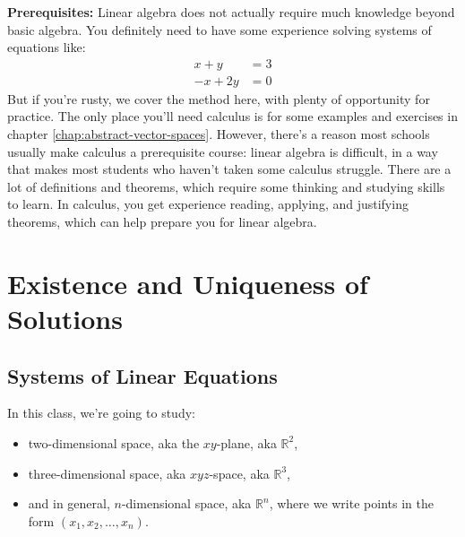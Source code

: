 \documentclass[11pt, letterpaper]{report}
\newcounter{exercise}[section]
\newcounter{example}[section]
\newcounter{theorem}[chapter]
\newcommand{\R}{\mathbb{R}}
\begin{document}
\textbf{Prerequisites:} Linear algebra does not actually require much knowledge beyond basic algebra. You definitely need to have some experience solving systems of equations like:
\[\begin{aligned}
  x + y &=3 \\
  -x + 2y &= 0
\end{aligned}\] 
But if you're rusty, we cover the method here, with plenty of opportunity for practice. The only place you'll need calculus is for some examples and exercises in chapter \ref{chap:abstract-vector-spaces}. However, there's a reason most schools usually make calculus a prerequisite course: linear algebra is difficult, in a way that makes most students who haven't taken some calculus struggle. There are a lot of definitions and theorems, which require some thinking and studying skills to learn. In calculus, you get experience reading, applying, and justifying theorems, which can help prepare you for linear algebra.

\chapter{Existence and Uniqueness of Solutions}
\label{chap:existence-and-uniqueness-of-solutions}


\section{Systems of Linear Equations}
\label{sec:systems-of-linear-eqns}

In this class, we're going to study:

\begin{itemize}
\item two-dimensional space, aka the $xy$-plane, aka $\R^2$,
\item three-dimensional space, aka $xyz$-space, aka $\R^3$,
\item and in general, $n$-dimensional space, aka $\R^n$, where we write points in the form $(x_{1}, x_2, \ldots, x_n)$.
\end{itemize}
\end{document}
